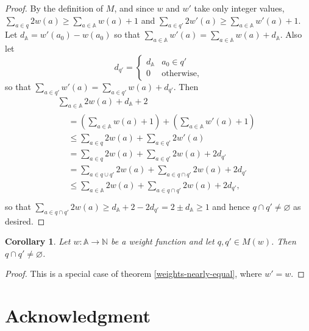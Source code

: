 \documentclass[journal]{IEEEtran}
\newtheorem{corollary}[theorem]{Corollary}
\begin{document}
\begin{proof} By the definition of $M$, and since $w$ and $w'$ take only
integer values,
%
$\sum_{a \in q} 2 w(a) \ge \sum_{a \in \mathbb A} w(a) + 1$
%
and
%
$\sum_{a \in q'} 2 w'(a) \ge \sum_{a \in \mathbb A} w'(a) + 1$.
%
Let $d_{\mathbb A} = w'(a_0) - w(a_0)$ so that $\sum_{a \in \mathbb A} w'(a) =
\sum_{a \in \mathbb A} w(a) + d_{\mathbb A}$. Also let \[
d_{q'} =
\begin{cases}
%
d_{\mathbb A} & a_0 \in q' \\
%
0 & \textrm{otherwise,}
%
\end{cases}
\]
so that $\sum_{a \in q'} w'(a) = \sum_{a \in q'} w(a) + d_{q'}$.
%
Then
\begin{gather*}
%
\sum_{a \in \mathbb A} 2w(a) + d_{\mathbb A} + 2 \\
%
\begin{aligned}
%
&= \left( \sum_{a \in \mathbb A} w(a)  + 1\right)
+  \left( \sum_{a \in \mathbb A} w'(a) + 1\right) \\
%
&\le \sum_{a \in q}  2w(a)
+    \sum_{a \in q'} 2w'(a) \\
%
&= \sum_{a \in q}  2w(a)
+  \sum_{a \in q'} 2w(a) + 2d_{q'}\\
%
&= \sum_{a \in q \cup q'} 2w(a)
+  \sum_{a \in q \cap q'} 2w(a) + 2d_{q'}\\
%
&\le \sum_{a \in \mathbb A} 2w(a)
+    \sum_{a \in q \cap q'} 2w(a) + 2d_{q'},\\
%
\end{aligned}\end{gather*} so that $\sum_{a \in q \cap q'} 2w(a) \ge d_{\mathbb
A} + 2 - 2d_{q'} = 2 \pm d_\mathbb A \ge 1$ and hence $q \cap q' \ne \varnothing$ as desired.
\end{proof}

\begin{corollary} \label{weights-equal} Let $w : \mathbb A \to \mathbb N$ be a
weight function and let $q, q' \in M(w)$. Then $q \cap q' \ne \varnothing$.
\end{corollary}

\begin{proof}
This is a special case of theorem \ref{weights-nearly-equal}, where $w' = w$.
\end{proof}

\section*{Acknowledgment}
\end{document}
